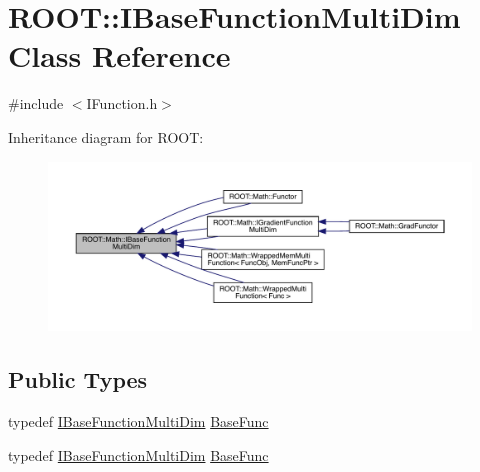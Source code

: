 \hypertarget{classROOT_1_1Math_1_1IBaseFunctionMultiDim}{}\section{R\+O\+OT\+:\+:I\+Base\+Function\+Multi\+Dim Class Reference}
\label{classROOT_1_1Math_1_1IBaseFunctionMultiDim}


{\ttfamily \#include $<$I\+Function.\+h$>$}



Inheritance diagram for R\+O\+OT\+:\nopagebreak
\begin{figure}[H]
\begin{center}
\leavevmode
\includegraphics[width=350pt]{d1/d72/classROOT_1_1Math_1_1IBaseFunctionMultiDim__inherit__graph}
\end{center}
\end{figure}
\subsection*{Public Types}
\begin{DoxyCompactItemize}
\item 
typedef \mbox{\hyperlink{classROOT_1_1Math_1_1IBaseFunctionMultiDim}{I\+Base\+Function\+Multi\+Dim}} \mbox{\hyperlink{classROOT_1_1Math_1_1IBaseFunctionMultiDim_a44c87c3e8c23d140cc3bf067d6480070}{Base\+Func}}
\item 
typedef \mbox{\hyperlink{classROOT_1_1Math_1_1IBaseFunctionMultiDim}{I\+Base\+Function\+Multi\+Dim}} \mbox{\hyperlink{classROOT_1_1Math_1_1IBaseFunctionMultiDim_a44c87c3e8c23d140cc3bf067d6480070}{Base\+Func}}
\end{DoxyCompactItemize}
